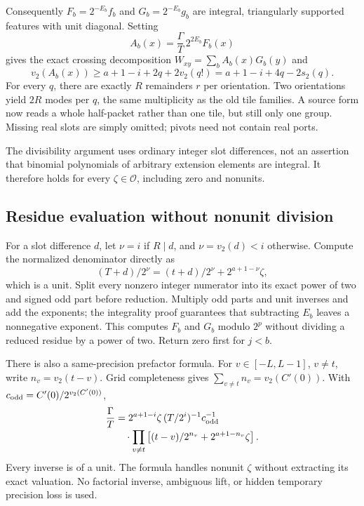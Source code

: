 Consequently $F_b=2^{-E_b}f_b$ and $G_b=2^{-E_b}g_b$ are integral, triangularly supported features with unit diagonal. Setting
\[
 A_b(x)=\frac{\Gamma}{T}\,2^{2E_b}F_b(x)
\]
gives the exact crossing decomposition $W_{xy}=\sum_b A_b(x)G_b(y)$ and
\begin{equation}\label{eq:slopefour}
 v_2(A_b(x))\ge a+1-i+2q+2v_2(q!)
 =a+1-i+4q-2s_2(q).
\end{equation}
For every $q$, there are exactly $R$ remainders $r$ per orientation. Two orientations yield $2R$ modes per $q$, the same multiplicity as the old tile families. A source form now reads a whole half-packet rather than one tile, but still only one group. Missing real slots are simply omitted; pivots need not contain real ports.

The divisibility argument uses ordinary integer slot differences, not an assertion that binomial polynomials of arbitrary extension elements are integral. It therefore holds for every $\zeta\in\mathcal O$, including zero and nonunits.

\subsection{Residue evaluation without nonunit division}
For a slot difference $d$, let $\nu=i$ if $R\mid d$, and $\nu=v_2(d)<i$ otherwise. Compute the normalized denominator directly as
\[
 (T+d)/2^\nu=(t+d)/2^\nu+2^{a+1-\nu}\zeta,
\]
which is a unit. Split every nonzero integer numerator into its exact power of two and signed odd part before reduction. Multiply odd parts and unit inverses and add the exponents; the integrality proof guarantees that subtracting $E_b$ leaves a nonnegative exponent. This computes $F_b$ and $G_b$ modulo $2^p$ without dividing a reduced residue by a power of two. Return zero first for $j<b$.

There is also a same-precision prefactor formula. For $v\in[-L,L-1]$, $v\ne t$, write $n_v=v_2(t-v)$. Grid completeness gives $\sum_{v\ne t}n_v=v_2(C'(0))$. With $c_{\rm odd}=C'(0)/2^{v_2(C'(0))}$,
\begin{align*}
 \frac{\Gamma}{T}
 &=2^{a+1-i}\zeta\,(T/2^i)^{-1}c_{\rm odd}^{-1}\\[-2pt]
 &\hspace{1em}\cdot\prod_{v\ne t}\left[(t-v)/2^{n_v}+2^{a+1-n_v}\zeta\right].
\end{align*}
Every inverse is of a unit. The formula handles nonunit $\zeta$ without extracting its exact valuation. No factorial inverse, ambiguous lift, or hidden temporary precision loss is used.


